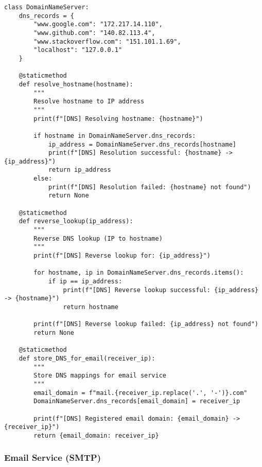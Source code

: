 \documentclass[12pt,a4paper]{article}
\begin{document}
\begin{lstlisting}[caption=DNS Implementation]
class DomainNameServer:
    dns_records = {
        "www.google.com": "172.217.14.110",
        "www.github.com": "140.82.113.4",
        "www.stackoverflow.com": "151.101.1.69",
        "localhost": "127.0.0.1"
    }
    
    @staticmethod
    def resolve_hostname(hostname):
        """
        Resolve hostname to IP address
        """
        print(f"[DNS] Resolving hostname: {hostname}")
        
        if hostname in DomainNameServer.dns_records:
            ip_address = DomainNameServer.dns_records[hostname]
            print(f"[DNS] Resolution successful: {hostname} -> {ip_address}")
            return ip_address
        else:
            print(f"[DNS] Resolution failed: {hostname} not found")
            return None
    
    @staticmethod
    def reverse_lookup(ip_address):
        """
        Reverse DNS lookup (IP to hostname)
        """
        print(f"[DNS] Reverse lookup for: {ip_address}")
        
        for hostname, ip in DomainNameServer.dns_records.items():
            if ip == ip_address:
                print(f"[DNS] Reverse lookup successful: {ip_address} -> {hostname}")
                return hostname
        
        print(f"[DNS] Reverse lookup failed: {ip_address} not found")
        return None
    
    @staticmethod
    def store_DNS_for_email(receiver_ip):
        """
        Store DNS mappings for email service
        """
        email_domain = f"mail.{receiver_ip.replace('.', '-')}.com"
        DomainNameServer.dns_records[email_domain] = receiver_ip
        
        print(f"[DNS] Registered email domain: {email_domain} -> {receiver_ip}")
        return {email_domain: receiver_ip}
\end{lstlisting}

\subsubsection{Email Service (SMTP)}
\end{document}
